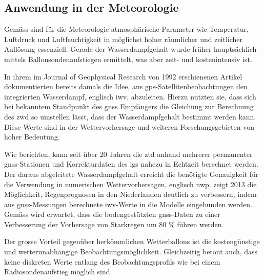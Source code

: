 \subsection{Anwendung in der Meteorologie}
Gemäss \textcite[S. 27]{klaffenboeckTroposphaerischeLaufzeitverzoegerungGNSSSignalen2005} sind für die Meteorologie atmosphärische Parameter wie Temperatur, Luftdruck
und Luftfeuchtigkeit in möglichst hoher räumlicher und zeitlicher Auflösung essenziell.
Gerade der Wasserdampfgehalt wurde früher hauptsächlich mittels
Ballonsondenaufstiegen ermittelt, was aber zeit- und kostenintensiv ist.

In ihrem im Journal of Geophysical Research von 1992 erschienenen Artikel dokumentierten \citeauthor{bevisGPSMeteorologyRemote1992} bereits damals die Idee,
aus \acrshort{gps}-Satellitenbeobachtungen den integrierten Wasserdampf, englisch \gls{iwv}, abzuleiten.
Hierzu nutzten sie, dass sich bei bekanntem Standpunkt des 
\gls{gnss} Empfängers die Gleichung zur Berechnung des \gls{zwd} so umstellen lässt, dass der Wasserdampfgehalt bestimmt werden kann.   
Diese Werte sind in der Wettervorhersage und weiteren Forschungsgebieten von hoher Bedeutung.

Wie \textcite{dousaRealtimeZenithTropospheric2014} berichten, kann seit 
über 20 Jahren die \gls{ztd} anhand mehrerer permanenter \acrshort{gnss}-Stationen und Korrekturdaten des \gls{igs} 
nahezu in Echtzeit berechnet werden. Der daraus abgeleitete Wasserdampfgehalt erreicht die benötigte Genauigkeit für die Verwendung 
in numerischen Wettervorhersagen, englisch \gls{nwp}.
\citeauthor{dehaanAssimilationGNSSZTD2013} zeigt 2013 die Möglichkeit, Regenprognosen in den Niederlanden deutlich zu verbessern, indem 
aus \acrshort{gnss}-Messungen berechnete \acrshort{iwv}-Werte in die Modelle eingebunden werden. 
Gemäss \textcite{rohmGroundbasedGNSSZTD2014} wird erwartet, dass die bodengestützten \acrshort{gnss}-Daten zu einer Verbesserung der Vorhersage von Starkregen
um 80 \% führen werden. 

Der grosse Vorteil gegenüber herkömmlichen Wetterballons ist die kostengünstige und wetterunabhängige Beobachtungsmöglichkeit. 
Gleichzeitig betont \textcite[S. 31]{klaffenboeckTroposphaerischeLaufzeitverzoegerungGNSSSignalen2005} auch, dass keine diskreten Werte entlang des Beobachtungsprofils
wie bei einem Radiosondenaufstieg möglich sind. 

